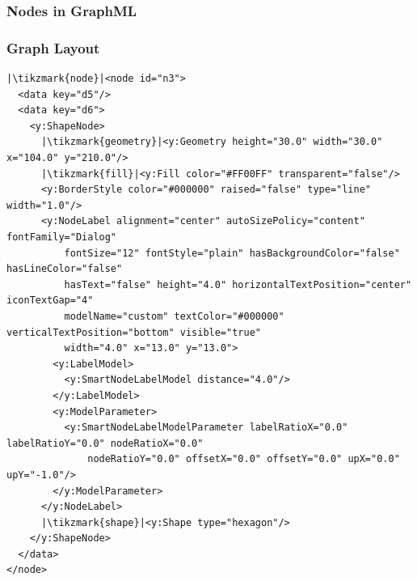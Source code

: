 {\begin{frame}[fragile]
\end{frame}

\subsubsection{Nodes in GraphML}
\begin{frame}[fragile]
  \frametitle{Graph Layout }
  \vspace{-2mm}
  
  \begin{verbatim}
|\tikzmark{node}|<node id="n3">
  <data key="d5"/>
  <data key="d6">
    <y:ShapeNode>
      |\tikzmark{geometry}|<y:Geometry height="30.0" width="30.0" x="104.0" y="210.0"/>
      |\tikzmark{fill}|<y:Fill color="#FF00FF" transparent="false"/>
      <y:BorderStyle color="#000000" raised="false" type="line" width="1.0"/>
      <y:NodeLabel alignment="center" autoSizePolicy="content" fontFamily="Dialog"
          fontSize="12" fontStyle="plain" hasBackgroundColor="false" hasLineColor="false"
          hasText="false" height="4.0" horizontalTextPosition="center" iconTextGap="4"
          modelName="custom" textColor="#000000" verticalTextPosition="bottom" visible="true"
          width="4.0" x="13.0" y="13.0">
        <y:LabelModel>
          <y:SmartNodeLabelModel distance="4.0"/>
        </y:LabelModel>
        <y:ModelParameter>
          <y:SmartNodeLabelModelParameter labelRatioX="0.0" labelRatioY="0.0" nodeRatioX="0.0"
              nodeRatioY="0.0" offsetX="0.0" offsetY="0.0" upX="0.0" upY="-1.0"/>
        </y:ModelParameter>
      </y:NodeLabel>
      |\tikzmark{shape}|<y:Shape type="hexagon"/>
    </y:ShapeNode>
  </data>
</node>
  \end{verbatim}
\end{frame}}
